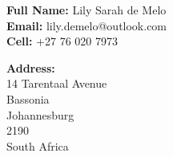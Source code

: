 \documentclass[10pt, onecolumn]{IEEEtran}
\begin{document}
\noindent
\begin{minipage}{0.45\textwidth}
  \raggedright
  \textbf{Full Name:} Lily Sarah de Melo \\
  \textbf{Email:} lily.demelo@outlook.com \\
  \textbf{Cell:} +27 76 020 7973 \\
\end{minipage}
\hfill
\begin{minipage}{0.45\textwidth}
  \raggedright
  \textbf{Address:} \\
  14 Tarentaal Avenue \\
  Bassonia \\
  Johannesburg \\ 
  2190 \\
  South Africa \\
\end{minipage}
\\\\
\end{document}
